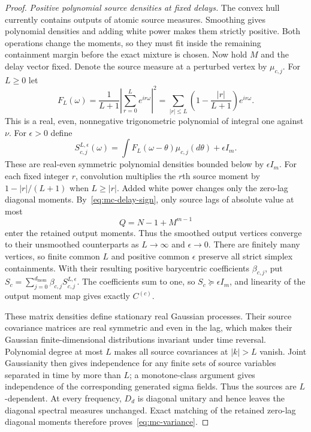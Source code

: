 \begin{proof}
\emph{Positive polynomial source densities at fixed delays.}
The convex hull currently contains outputs of atomic source measures. Smoothing gives polynomial densities and adding white power makes them strictly positive. Both operations change the moments, so they must fit inside the remaining containment margin before the exact mixture is chosen.
Now hold $M$ and the delay vector fixed. Denote the source measure at a
perturbed vertex by $\mu_{c,j}$. For $L\ge0$ let
\[
 F_L(\omega)=\frac1{L+1}\left|\sum_{r=0}^L e^{ir\omega}\right|^2
   =\sum_{|r|\le L}\left(1-\frac{|r|}{L+1}\right)e^{ir\omega}.
\]
This is a real, even, nonnegative trigonometric polynomial of integral
one against $\nu$. For $\epsilon>0$ define
\begin{equation}\label{eq:mc-smooth}
 S_{c,j}^{L,\epsilon}(\omega)
   =\int F_L(\omega-\theta)\mu_{c,j}(d\theta)+\epsilon I_m.
\end{equation}
These are real-even symmetric polynomial densities bounded below by
$\epsilon I_m$. For each fixed integer $r$, convolution multiplies the
$r$th source moment by $1-|r|/(L+1)$ when $L\ge|r|$. Added white power
changes only the zero-lag diagonal moments. By~\eqref{eq:mc-delay-sign},
only source lags of absolute value at most
\begin{equation}\label{eq:mc-Q}
 Q=N-1+M^{m-1}
\end{equation}
enter the retained output moments. Thus the smoothed output vertices
converge to their unsmoothed counterparts as $L\to\infty$ and
$\epsilon\to0$. There are finitely many vertices, so finite common
$L$ and positive common $\epsilon$ preserve all strict simplex
containments. With their resulting positive barycentric coefficients
$\beta_{c,j}$, put $S_c=\sum_{j=0}^{d_{\mathrm{mom}}}\beta_{c,j}S_{c,j}^{L,\epsilon}$.
The coefficients sum to one, so $S_c\succeq\epsilon I_m$, and linearity
of the output moment map gives exactly $C^{(c)}$.

These matrix densities define stationary real Gaussian processes.
Their source covariance matrices are real symmetric and even in the
lag, which makes their Gaussian finite-dimensional distributions
invariant under time reversal. Polynomial degree at most $L$ makes
all source covariances at $|k|>L$ vanish. Joint Gaussianity then gives
independence for any finite sets of source variables separated in time
by more than $L$; a monotone-class argument gives independence of the
corresponding generated sigma fields. Thus the sources are $L$-dependent.
At every frequency, $D_d$ is diagonal unitary and hence leaves the
diagonal spectral measures unchanged. Exact matching of the retained
zero-lag diagonal moments therefore proves~\eqref{eq:mc-variance}.


\end{proof}
